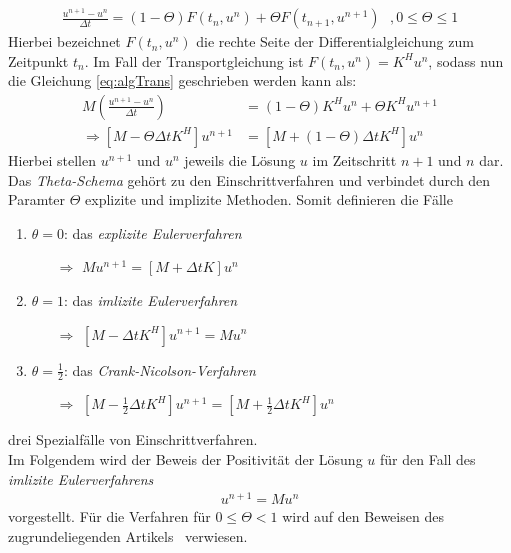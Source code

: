 \documentclass[12pt,titlepage]{article}
\begin{document}
\begin{align}
 \frac{u^{n+1}-u^n}{\Delta t}=(1-\Theta)F(t_n,u^n)+\Theta F(t_{n+1},u^{n+1})~~~,0\le\Theta\le1\nonumber
\end{align}
Hierbei bezeichnet $F(t_n,u^n)$ die rechte Seite der Differentialgleichung zum Zeitpunkt $t_n$. Im Fall der Transportgleichung ist $F(t_n,u^n)=K^Hu^n$, sodass nun die Gleichung \eqref{eq:algTrans} geschrieben werden kann als:
\begin{align}
 M(\frac{u^{n+1}-u^n}{\Delta t})&=(1-\Theta)K^Hu^n+\Theta K^Hu^{n+1}\nonumber\\
\Rightarrow [M-\Theta\Delta tK^H]u^{n+1}&=[M+(1-\Theta)\Delta tK^H]u^n\label{eq:thetaGleich}
\end{align}
Hierbei stellen $u^{n+1}$ und $u^n$ jeweils die Lösung $u$ im Zeitschritt $n+1$  und $n$ dar. Das \textit{Theta-Schema} gehört zu den Einschrittverfahren und verbindet durch den Paramter $\Theta$ explizite und implizite Methoden. Somit definieren die Fälle
\begin{enumerate}
 \item $\theta=0$: das \textit{explizite Eulerverfahren}
 \begin{enumerate}
  \item[$\Rightarrow$] $Mu^{n+1}=[M+\Delta tK]u^n$
 \end{enumerate}
 \item $\theta=1$:    das \textit{imlizite Eulerverfahren}
 \begin{enumerate}
  \item[$\Rightarrow$] $[M-\Delta tK^H]u^{n+1}=Mu^n$
 \end{enumerate}
 \item $\theta=\frac{1}{2}$:  das \textit{Crank-Nicolson-Verfahren}
 \begin{enumerate}
  \item[$\Rightarrow$] $[M-\frac{1}{2}\Delta tK^H]u^{n+1}=[M+\frac{1}{2}\Delta tK^H]u^n$
 \end{enumerate}
\end{enumerate}
drei Spezialfälle von Einschrittverfahren.\\
Im Folgendem wird der Beweis der Positivität der Lösung $u$ für den Fall des \textit{imlizite Eulerverfahrens}
\begin{align}
 [M-\Delta tK^H]u^{n+1}=Mu^n\label{eq:LGS_H}
\end{align}
vorgestellt. Für die Verfahren für $0\le\Theta<1$ wird auf den Beweisen des zugrundeliegenden Artikels~\cite{kuzmin2002flux} verwiesen.\\
\end{document}
